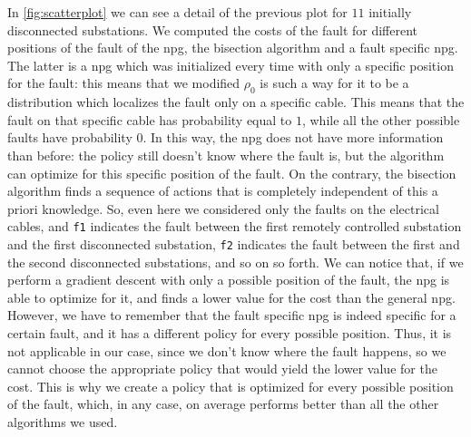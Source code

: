 
In \autoref{fig:scatterplot} we can see a detail of the previous plot for $11$ initially disconnected substations. We computed the costs of the fault for different positions of the fault of the \acrshort{npg}, the bisection algorithm and a fault specific \acrshort{npg}. The latter is a \acrshort{npg} which was initialized every time with only a specific position for the fault: this means that we modified $\rho_0$ is such a way for it to be a distribution which localizes the fault only on a specific cable. This means that the fault on that specific cable has probability equal to $1$, while all the other possible faults have probability $0$. In this way, the \acrshort{npg} does not have more information than before: the policy still doesn't know where the fault is, but the algorithm can optimize for this specific position of the fault. On the contrary, the bisection algorithm finds a sequence of actions that is completely independent of this a priori knowledge.
So, even here we considered only the faults on the electrical cables, and \texttt{f1} indicates the fault between the first remotely controlled substation and the first disconnected substation, \texttt{f2} indicates the fault between the first and the second disconnected substations, and so on so forth.
We can notice that, if we perform a gradient descent with only a possible position of the fault, the \acrshort{npg} is able to optimize for it, and finds a lower value for the cost than the general \acrshort{npg}.
However, we have to remember that the fault specific \acrshort{npg} is indeed specific for a certain fault, and it has a different policy for every possible position. Thus, it is not applicable in our case, since we don't know where the fault happens, so we cannot choose the appropriate policy that would yield the lower value for the cost.
This is why we create a policy that is optimized for every possible position of the fault, which, in any case, on average performs better than all the other algorithms we used.